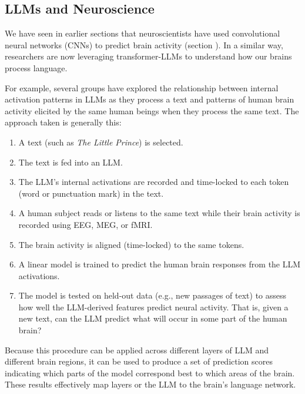 \subsection{LLMs and Neuroscience}

We have seen in earlier sections that neuroscientists have used convolutional neural networks (CNNs) to predict brain activity (section ). In a similar way, researchers are now leveraging transformer-LLMs to understand how our brains process language. 

For example, several groups \cite{pasquiou2022neural, schrimpf2021neural, caucheteux2022brains} have explored the relationship between internal activation patterns in LLMs as they process a text and patterns of human brain activity elicited by the same  human beings when they process the same text. The approach taken is generally this:  
\begin{enumerate}
  \item A text (such as \emph{The Little Prince}) is selected.
  \item The text is fed into an LLM.
  \item The LLM's internal activations are recorded and time-locked to each token (word or punctuation mark) in the text.
  \item A human subject reads or listens to the same text while their brain activity is recorded using EEG, MEG, or fMRI.
  \item The brain activity is  aligned (time-locked) to the same tokens.
  \item A linear model is trained to predict the human brain responses from the LLM activations.
  \item The model is tested on held-out data (e.g., new passages of text) to assess how well the LLM-derived features predict neural activity. That is, given a new text, can the LLM predict what will occur in some part of the human brain?
\end{enumerate}

Because this procedure can be applied across different layers of LLM and different brain regions, it can be used to produce  a set of prediction scores indicating which parts of the model correspond best to which areas of the brain. These results effectively map layers or the LLM to the brain’s language network.


